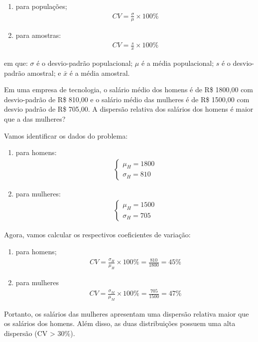 \begin{enumerate}[label=\alph*.]
    \item para populações;
    \begin{align*}
        CV=\frac{\sigma}{\mu}\times 100\%
    \end{align*}
    \item para amostras:
        \begin{align*}
        CV=\frac{s}{\bar{x}}\times 100\%
    \end{align*}
\end{enumerate}
em que: $\sigma$ é o desvio-padrão populacional; $\mu$ é a média populacional; $s$ é o desvio-padrão amostral; e $\bar{x}$ é a
média amostral.
\begin{example}
    Em uma empresa de tecnologia, o salário médio dos homens é de R\$ 1800,00 com desvio-padrão de R\$ 810,00 e o salário médio das mulheres é de R\$ 1500,00 com desvio padrão de R\$ 705,00. A dispersão relativa dos salários dos homens é maior que a das mulheres?

    Vamos identificar os dados do problema:
    \begin{enumerate}[label=\alph*.]
        \item para homens:
            \begin{align*}
            \begin{cases}
                \mu_H=1800\\
                \sigma_H=810
            \end{cases}
        \end{align*}
        \item para mulheres:
            \begin{align*}
            \begin{cases}
                \mu_H=1500\\
                \sigma_H=705
            \end{cases}
        \end{align*}
    \end{enumerate}
Agora, vamos calcular os respectivos coeficientes de variação:
    \begin{enumerate}[label=\alph*.]
        \item para homens;
            \begin{align*}
                CV=\frac{\sigma_H}{\mu_H}\times 100\%=\frac{810}{1800}=45\%
            \end{align*}
        \item para mulheres
            \begin{align*}
                CV=\frac{\sigma_M}{\mu_M}\times 100\%=\frac{705}{1500}=47\%
            \end{align*}
    \end{enumerate}
    Portanto, os salários das mulheres apresentam uma dispersão relativa maior que os salários dos homens. Além disso, as duas distribuições possuem uma alta dispersão (CV > 30\%).
\end{example}